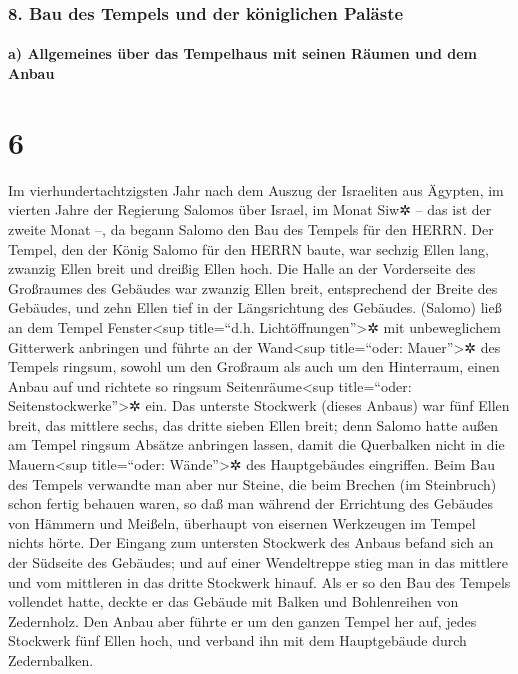 \hypertarget{bau-des-tempels-und-der-kuxf6niglichen-paluxe4ste}{%
\subsubsection{8. Bau des Tempels und der königlichen
Paläste}\label{bau-des-tempels-und-der-kuxf6niglichen-paluxe4ste}}

\hypertarget{a-allgemeines-uxfcber-das-tempelhaus-mit-seinen-ruxe4umen-und-dem-anbau}{%
\paragraph{a) Allgemeines über das Tempelhaus mit seinen Räumen und dem
Anbau}\label{a-allgemeines-uxfcber-das-tempelhaus-mit-seinen-ruxe4umen-und-dem-anbau}}

\hypertarget{section-5}{%
\section{6}\label{section-5}}

Im vierhundertachtzigsten Jahr nach dem Auszug der
Israeliten aus Ägypten, im vierten Jahre der Regierung Salomos über
Israel, im Monat Siw✲ -- das ist der zweite Monat --, da begann Salomo
den Bau des Tempels für den HERRN. Der Tempel, den der
König Salomo für den HERRN baute, war sechzig Ellen lang, zwanzig Ellen
breit und dreißig Ellen hoch. Die Halle an der Vorderseite
des Großraumes des Gebäudes war zwanzig Ellen breit, entsprechend der
Breite des Gebäudes, und zehn Ellen tief in der Längsrichtung des
Gebäudes. (Salomo) ließ an dem Tempel Fenster\textless sup
title=``d.h. Lichtöffnungen''\textgreater✲ mit unbeweglichem Gitterwerk
anbringen und führte an der Wand\textless sup
title=``oder: Mauer''\textgreater✲ des Tempels ringsum, sowohl um den
Großraum als auch um den Hinterraum, einen Anbau auf und richtete so
ringsum Seitenräume\textless sup title=``oder:
Seitenstockwerke''\textgreater✲ ein. Das unterste
Stockwerk (dieses Anbaus) war fünf Ellen breit, das mittlere sechs, das
dritte sieben Ellen breit; denn Salomo hatte außen am Tempel ringsum
Absätze anbringen lassen, damit die Querbalken nicht in die
Mauern\textless sup title=``oder: Wände''\textgreater✲ des Hauptgebäudes
eingriffen. Beim Bau des Tempels verwandte man aber nur
Steine, die beim Brechen (im Steinbruch) schon fertig behauen waren, so
daß man während der Errichtung des Gebäudes von Hämmern und Meißeln,
überhaupt von eisernen Werkzeugen im Tempel nichts hörte.
Der Eingang zum untersten Stockwerk des Anbaus befand sich
an der Südseite des Gebäudes; und auf einer Wendeltreppe stieg man in
das mittlere und vom mittleren in das dritte Stockwerk hinauf.
Als er so den Bau des Tempels vollendet hatte, deckte er
das Gebäude mit Balken und Bohlenreihen von Zedernholz.
Den Anbau aber führte er um den ganzen Tempel her auf,
jedes Stockwerk fünf Ellen hoch, und verband ihn mit dem Hauptgebäude
durch Zedernbalken.

